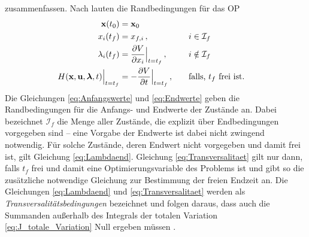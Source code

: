 zusammenfassen.
Nach \cite{KnutGraichen.2012} lauten die Randbedingungen für das \gls{OP} 
\begin{alignat}{2}
\boldsymbol{\mathrm{x}}(t_0) &= \boldsymbol{\mathrm{x}}_0 \label{eq:Anfangswerte} \\
x_i(t_f) &= x_{f,i}\,, & & \quad i \in\mathcal{I}_f \label{eq:Endwerte} \\
\lambda_i(t_f) &= \frac{\partial V}{\partial x_i}\Big|_{t=t_f}\,, & & \quad i \notin \mathcal{I}_f \label{eq:Lambdaend} \\
H(\boldsymbol{\mathrm{x}},\boldsymbol{\mathrm{u}},\boldsymbol{\mathrm{\lambda}},t)\Big|_{t=t_f} &= -\frac{\partial V}{\partial t}\Big|_{t=t_f}\,, & & \quad \textrm{falls, $t_f$ frei ist.} \label{eq:Transversalitaet}
\end{alignat}
Die Gleichungen \eqref{eq:Anfangswerte} und \eqref{eq:Endwerte} geben die Randbedingungen für die Anfangs- und Endwerte der Zustände an. Dabei bezeichnet $\mathcal{I}_f$ die Menge aller Zustände, die explizit über Endbedingungen vorgegeben sind -- eine Vorgabe der Endwerte ist dabei nicht zwingend notwendig. Für solche Zustände, deren Endwert nicht vorgegeben und damit frei ist, gilt Gleichung \eqref{eq:Lambdaend}. Gleichung \eqref{eq:Transversalitaet} gilt nur dann, falls $t_f$ frei und damit eine Optimierungsvariable des Problems ist und gibt so die zusätzliche notwendige Gleichung zur Bestimmung der freien Endzeit an. Die Gleichungen \eqref{eq:Lambdaend} und \eqref{eq:Transversalitaet} werden als \textit{Transversalitätsbedingungen} bezeichnet und folgen daraus, dass auch die Summanden außerhalb des Integrals der totalen Variation \eqref{eq:J_totale_Variation} Null ergeben müssen \cite{KnutGraichen.2012}. 
